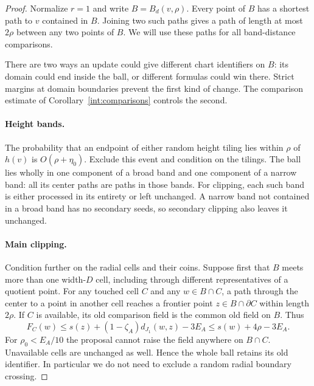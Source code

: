 \begin{proof}
Normalize $r=1$ and write $B=B_d(v,\rho)$. Every point of $B$ has
a shortest path to $v$ contained in $B$. Joining two such paths gives
a path of length at most $2\rho$ between any two points of $B$.
We will use these paths for all band-distance comparisons.

There are two ways an update could give different chart identifiers on
$B$: its domain could end inside the ball, or different formulas could
win there. Strict margins at domain boundaries prevent the first kind
of change. The comparison estimate of Corollary~\ref{int:comparisons}
controls the second.

\paragraph{Height bands.}
The probability that an endpoint of either random height tiling lies
within $\rho$ of $h(v)$ is $O(\rho+\eta_0)$. Exclude this event and
condition on the tilings. The ball lies wholly in one component of a
broad band and one component of a narrow band: all its center paths
are paths in those bands.
For clipping, each such band is either processed in its entirety or left unchanged.
A narrow band not contained in a broad band has no secondary seeds,
so secondary clipping also leaves it unchanged.

\paragraph{Main clipping.}
Condition further on the radial cells and their coins. Suppose first
that $B$ meets more than one width-$D$ cell, including through different
representatives of a quotient point. For any touched cell $C$ and any
$w\in B\cap C$, a path through the center to a point in another cell
reaches a frontier point $z\in B\cap\partial C$ within length $2\rho$.
If $C$ is available, its old comparison field is the common old field
on $B$. Thus
\[
 F_C(w)\le s(z)+(1-\zeta_A)d_{J_1}(w,z)-3E_A
          \le s(w)+4\rho-3E_A.
\]
For $\rho_0<E_A/10$ the proposal cannot raise the field anywhere on
$B\cap C$. Unavailable cells are unchanged as well. Hence the whole
ball retains its old identifier. In particular we do not need to
exclude a random radial boundary crossing.


\end{proof}
